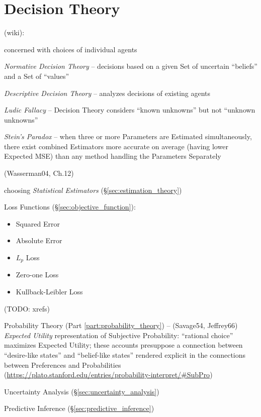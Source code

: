 \section{Decision Theory}\label{sec:decision_theory}

(wiki):

concerned with choices of individual agents

\emph{Normative Decision Theory} -- decisions based on a given Set of uncertain
``beliefs'' and a Set of ``values''

\emph{Descriptive Decision Theory} -- analyzes decisions of existing agents

\emph{Ludic Fallacy} -- Decision Theory considers ``known unknowns'' but not
``unknown unknowns''

\emph{Stein's Paradox} -- when three or more Parameters are Estimated
simultaneously, there exist combined Estimators more accurate on average (having
lower Expected MSE) than any method handling the Parameters Separately

(Wasserman04, Ch.12)

choosing \emph{Statistical Estimators} (\S\ref{sec:estimation_theory})

Loss Functions (\S\ref{sec:objective_function}):
\begin{itemize}
  \item Squared Error
  \item Absolute Error
  \item $L_p$ Loss
  \item Zero-one Loss
  \item Kullback-Leibler Loss
\end{itemize}
(TODO: xrefs)

\fist Probability Theory (Part \ref{part:probability_theory}) -- (Savage54,
Jeffrey66) \emph{Expected Utility} representation of Subjective Probability:
``rational choice'' maximizes Expected Utility; these accounts presuppose a
connection between ``desire-like states'' and ``belief-like states'' rendered
explicit in the connections between Preferences and Probabilities
(\url{https://plato.stanford.edu/entries/probability-interpret/#SubPro})

\fist Uncertainty Analysis (\S\ref{sec:uncertainty_analysis})

\fist Predictive Inference (\S\ref{sec:predictive_inference})

